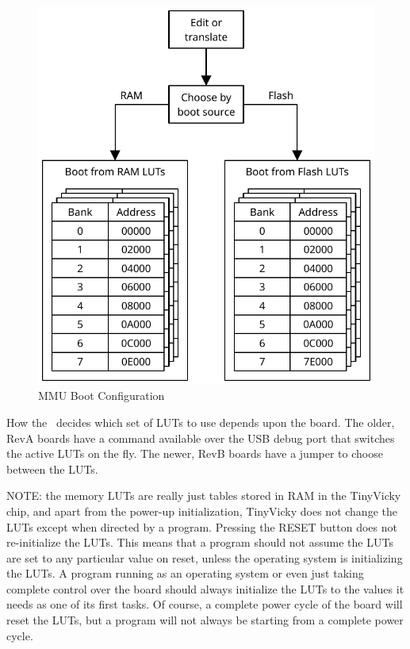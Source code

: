 \begin{figure}[ht]
    \begin{center}
        \includegraphics{images/MemoryLUTSelection.pdf}
    \end{center}
    \caption{MMU Boot Configuration}
    \label{fig:lut_choice}
\end{figure}

How the \jr\ decides which set of LUTs to use depends upon the board. The older, RevA boards have a command available over the USB debug port that switches the active LUTs on the fly. The newer, RevB boards have a jumper to choose between the LUTs.

NOTE: the memory LUTs are really just tables stored in RAM in the TinyVicky chip, and apart from the power-up initialization, TinyVicky does not change the LUTs except when directed by a program. Pressing the RESET button does not re-initialize the LUTs. This means that a program should not assume the LUTs are set to any particular value on reset, unless the operating system is initializing the LUTs. A program running as an operating system or even just taking complete control over the board should always initialize the LUTs to the values it needs as one of its first tasks. Of course, a complete power cycle of the board will reset the LUTs, but a program will not always be starting from a complete power cycle.
